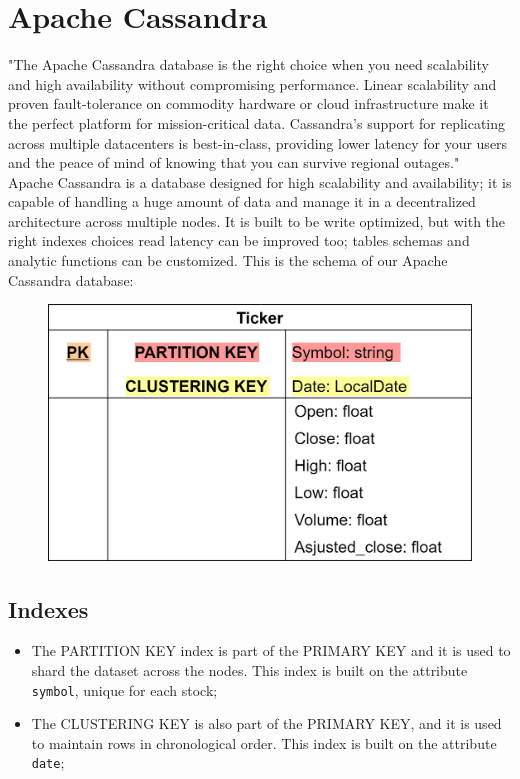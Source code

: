\section{Apache Cassandra}
"The Apache Cassandra database is the right choice when you need scalability and
high availability without compromising performance. Linear scalability and
proven fault-tolerance on commodity hardware or cloud infrastructure make it the
perfect platform for mission-critical data. Cassandra's support for replicating
across multiple datacenters is best-in-class, providing lower latency for your
users and the peace of mind of knowing that you can survive regional outages."\\
Apache Cassandra is a database designed for high scalability and availability;
it is capable of handling a huge amount of data and manage it in a decentralized
architecture across multiple nodes. It is built to be write optimized, but with
the right indexes choices read latency can be improved too; tables schemas and
analytic functions can be customized. This is the schema of our Apache Cassandra
database:
\begin{figure}[H]
	\begin{center}
		\includegraphics[scale=0.2]{img/cassandraDB_scheme.png}
	\end{center}
\end{figure}
\subsection{Indexes}
\begin{itemize}
    \item The PARTITION KEY index is part of the PRIMARY KEY and it is used to
    shard the dataset across the nodes. This index is built on the attribute
    \texttt{symbol}, unique for each stock;
    \item The CLUSTERING KEY is also part of the PRIMARY KEY, and it is used to
    maintain rows in chronological order. This index is built on the attribute
    \texttt{date};
\end{itemize}

